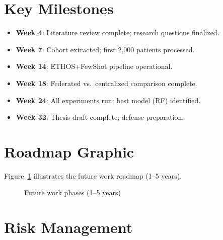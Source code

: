 \section{Key Milestones}

\begin{itemize}
\item \textbf{Week 4}: Literature review complete; research questions finalized.
\item \textbf{Week 7}: Cohort extracted; first 2,000 patients processed.
\item \textbf{Week 14}: ETHOS+FewShot pipeline operational.
\item \textbf{Week 18}: Federated vs.\ centralized comparison complete.
\item \textbf{Week 24}: All experiments run; best model (RF) identified.
\item \textbf{Week 32}: Thesis draft complete; defense preparation.
\end{itemize}

\section{Roadmap Graphic}

Figure~\ref{fig:roadmap} illustrates the future work roadmap (1--5 years).

\begin{figure}[htbp]
\centering
{}
\caption{Future work phases (1--5 years)}
\label{fig:roadmap}
\end{figure}

\section{Risk Management}


